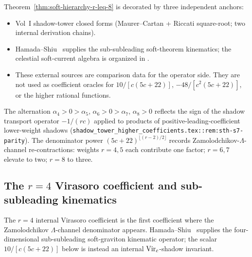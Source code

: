 \begin{remark}
\label{rem:smsb-hziv-r-leq-8}
Theorem~\ref{thm:soft-hierarchy-r-leq-8} is decorated by three
independent anchors:
\begin{itemize}
\item[(A)] Vol~I shadow-tower closed forms (Maurer--Cartan + Riccati
square-root; two internal derivation chains).
\item[(B)] Hamada--Shiu~\cite{HamadaShiuSubsubSoft} supplies the
sub-subleading soft-theorem kinematics; the celestial soft-current
algebra is organized in
\cite{GuevaraHimwichPateStrominger21,StromingerWInfinityCelestial}.
\item[(C)] These external sources are comparison data for the operator
side.  They are not used as coefficient oracles for
\(10/[c(5c+22)]\), \(-48/[c^2(5c+22)]\), or the higher rational
functions.
\end{itemize}
\end{remark}

\begin{remark}
\label{rem:smsb-sign-pole}
The alternation $\alpha_4 > 0 > \alpha_5$, $\alpha_6 > 0 > \alpha_7$,
$\alpha_8 > 0$ reflects the sign of the shadow transport operator
$-1 / (r c)$ applied to products of positive-leading-coefficient
lower-weight shadows
(\texttt{shadow\_tower\_higher\_coefficients.tex::rem:sth-s7-parity}).
The denominator power $(5 c + 22)^{\lfloor (r - 2)/2 \rfloor}$
records Zamolodchikov-$\Lambda$-channel re-contractions: weights
$r = 4, 5$ each contribute one factor; $r = 6, 7$ elevate to two; $r =
8$ to three.
\end{remark}

\subsection{The \(r = 4\) Virasoro coefficient and sub-subleading kinematics}
\label{subsec:smsb-hsl-match}

The $r = 4$ internal Virasoro coefficient is the first coefficient
where the Zamolodchikov \(\Lambda\)-channel denominator appears.
Hamada--Shiu~\cite{HamadaShiuSubsubSoft} supplies the
four-dimensional sub-subleading soft-graviton kinematic operator; the
scalar \(10/[c(5c+22)]\) below is instead an internal
\(\mathrm{Vir}_c\)-shadow invariant.

